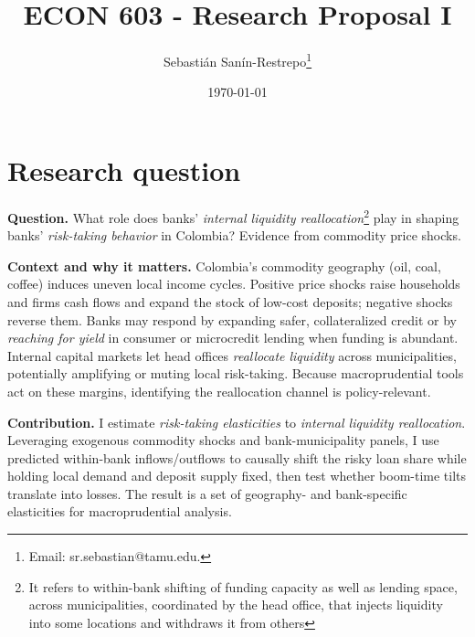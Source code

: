 



\title{\Large \textbf{ECON 603 - Research Proposal I}}

\author{Sebasti\'an San\'in-Restrepo\thanks{Email: sr.sebastian@tamu.edu.}} 
\date{\today}

\maketitle
\thispagestyle{empty} 
\doublespacing
\thispagestyle{empty} 

\vspace{-10mm}

\doublespacing

\section{ Research question} \label{section:rq} 

\noindent \textbf{Question.} What role does banks' \textit{internal liquidity reallocation}\footnote{It refers to within-bank shifting of funding capacity as well as lending space, across municipalities, coordinated by the head office, that injects liquidity into some locations and withdraws it from others} play in shaping banks' \textit{risk-taking behavior} in Colombia? Evidence from commodity price shocks.


\medskip
\noindent
\textbf{Context and why it matters.} Colombia’s commodity geography (oil, coal, coffee) induces uneven local income cycles. Positive price shocks raise households and firms cash flows and expand the stock of low-cost deposits; negative shocks reverse them. Banks may respond by expanding safer, collateralized credit or by \textit{reaching for yield} in consumer or microcredit lending when funding is abundant. Internal capital markets let head offices \textit{reallocate liquidity} across municipalities, potentially amplifying or muting local risk-taking. Because macroprudential tools act on these margins, identifying the reallocation channel is policy-relevant.


\medskip
\noindent
\textbf{Contribution.} I estimate \textit{risk-taking elasticities} to \textit{internal liquidity reallocation}. Leveraging exogenous commodity shocks and bank-municipality panels, I use predicted within-bank inflows/outflows to causally shift the risky loan share while holding local demand and deposit supply fixed, then test whether boom-time tilts translate into losses. The result is a set of geography- and bank-specific elasticities for macroprudential analysis.



